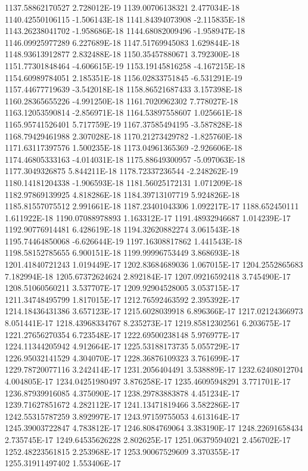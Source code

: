 1137.58862170527  2.728012E-19
1139.00706138321  2.477034E-18
1140.42550106115  -1.506143E-18
1141.84394073908  -2.115835E-18
1143.26238041702  -1.958686E-18
1144.68082009496  -1.958947E-18
1146.09925977289  6.227689E-18
1147.51769945083  1.629844E-18
1148.93613912877  2.832488E-18
1150.35457880671  3.792300E-18
1151.77301848464  -4.606615E-19
1153.19145816258  -4.167215E-18
1154.60989784051  2.185351E-18
1156.02833751845  -6.531291E-19
1157.44677719639  -3.542018E-18
1158.86521687433  3.157398E-18
1160.28365655226  -4.991250E-18
1161.7020962302  7.778027E-18
1163.12053590814  -2.856971E-18
1164.53897558607  1.025661E-18
1165.95741526401  5.717759E-19
1167.37585494195  -3.587828E-18
1168.79429461988  2.307028E-18
1170.21273429782  -1.825760E-18
1171.63117397576  1.500235E-18
1173.04961365369  -2.926606E-18
1174.46805333163  -4.014031E-18
1175.88649300957  -5.097063E-18
1177.3049326875  5.844211E-18
1178.72337236544  -2.248262E-19
1180.14181204338  -1.906593E-18
1181.56025172131  1.071209E-18
1182.97869139925  4.818286E-18
1184.39713107719  5.924826E-18
1185.81557075512  2.991661E-18
1187.23401043306  1.092217E-17
1188.652450111  1.611922E-18
1190.07088978893  1.163312E-17
1191.48932946687  1.014239E-17
1192.90776914481  6.428619E-18
1194.32620882274  3.061543E-18
1195.74464850068  -6.626644E-19
1197.16308817862  1.441543E-18
1198.58152785655  6.900151E-18
1199.99996753449  3.868693E-18
1201.41840721243  1.019449E-17
1202.83684689036  1.067015E-17
1204.2552865683  7.182994E-18
1205.67372624624  2.892184E-17
1207.09216592418  3.745490E-17
1208.51060560211  3.537707E-17
1209.92904528005  3.053715E-17
1211.34748495799  1.817015E-17
1212.76592463592  2.395392E-17
1214.18436431386  3.657123E-17
1215.6028039918  6.896366E-17
1217.02124366973  8.051441E-17
1218.43968334767  8.235273E-17
1219.85812302561  6.203675E-17
1221.27656270354  6.723548E-17
1222.69500238148  5.976977E-17
1224.11344205942  4.912664E-17
1225.53188173735  5.055729E-17
1226.95032141529  4.304070E-17
1228.36876109323  3.761699E-17
1229.78720077116  3.242414E-17
1231.2056404491  3.538889E-17
1232.62408012704  4.004805E-17
1234.04251980497  3.876258E-17
1235.46095948291  3.771701E-17
1236.87939916085  4.375090E-17
1238.29783883878  4.451234E-17
1239.71627851672  4.282112E-17
1241.13471819466  3.582286E-17
1242.55315787259  3.892997E-17
1243.97159755053  4.613164E-17
1245.39003722847  4.783812E-17
1246.8084769064  3.383190E-17
1248.22691658434  2.735745E-17
1249.64535626228  2.802625E-17
1251.06379594021  2.456702E-17
1252.48223561815  2.253968E-17
1253.90067529609  3.370355E-17
1255.31911497402  1.553406E-17
